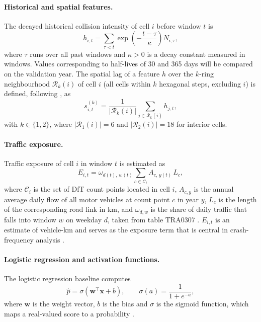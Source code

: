 \paragraph{Historical and spatial features.}
The decayed historical collision intensity of cell $i$ before window $t$ is
\begin{equation}
h_{i,t} = \sum_{\tau < t} \exp\!\left(-\frac{t-\tau}{\kappa}\right) N_{i,\tau},
\label{eq:decay}
\end{equation}
where $\tau$ runs over all past windows and $\kappa>0$ is a decay constant measured in windows. Values corresponding to half-lives of 30 and 365 days will be compared on the validation year. The spatial lag of a feature $h$ over the $k$-ring neighbourhood $\mathcal{R}_k(i)$ of cell $i$ (all cells within $k$ hexagonal steps, excluding $i$) is defined, following \cite{anselin1988spatial}, as
\begin{equation}
s^{(k)}_{i,t} = \frac{1}{\left|\mathcal{R}_k(i)\right|} \sum_{j \in \mathcal{R}_k(i)} h_{j,t},
\label{eq:spatiallag}
\end{equation}
with $k \in \{1,2\}$, where $|\mathcal{R}_1(i)|=6$ and $|\mathcal{R}_2(i)|=18$ for interior cells.

\paragraph{Traffic exposure.}
Traffic exposure of cell $i$ in window $t$ is estimated as
\begin{equation}
E_{i,t} = \omega_{d(t),\,w(t)} \sum_{c \in \mathcal{C}_i} A_{c,\,y(t)} \, L_{c},
\label{eq:exposure}
\end{equation}
where $\mathcal{C}_i$ is the set of DfT count points located in cell $i$, $A_{c,y}$ is the annual average daily flow of all motor vehicles at count point $c$ in year $y$, $L_c$ is the length of the corresponding road link in km, and $\omega_{d,w}$ is the share of daily traffic that falls into window $w$ on weekday $d$, taken from table TRA0307 \cite{dft2025tra0307}. $E_{i,t}$ is an estimate of vehicle-km and serves as the exposure term that is central in crash-frequency analysis \cite{lord2010statistical}.

\paragraph{Logistic regression and activation functions.}
The logistic regression baseline computes
\begin{equation}
\hat{p} = \sigma\!\left(\mathbf{w}^{\top}\mathbf{x} + b\right), \qquad
\sigma(a) = \frac{1}{1+e^{-a}},
\label{eq:logreg}
\end{equation}
where $\mathbf{w}$ is the weight vector, $b$ is the bias and $\sigma$ is the sigmoid function, which maps a real-valued score to a probability \cite{hastie2009elements}.

